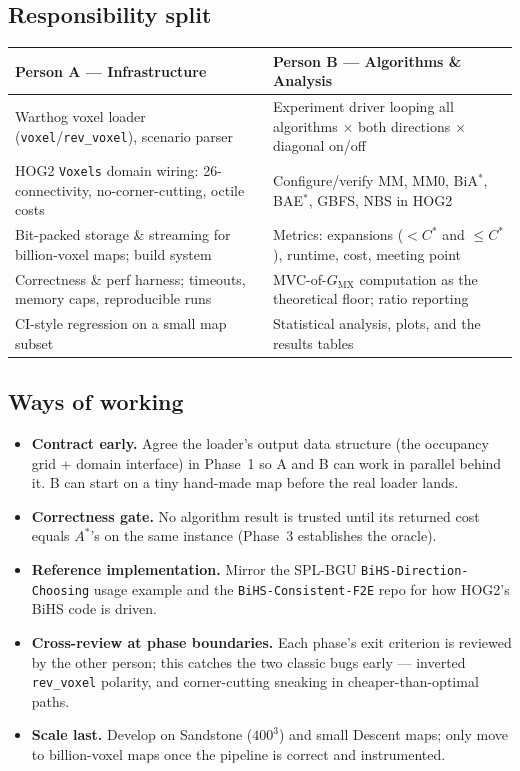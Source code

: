\documentclass[11pt]{article}
\newcommand{\Cstar}{C^{*}}
\newcommand{\GMX}{G_{\mathrm{MX}}}
\begin{document}
\subsection{Responsibility split}
\begin{center}
\renewcommand{\arraystretch}{1.25}
\begin{longtable}{@{}p{5.7cm}p{5.7cm}@{}}
\toprule
\textbf{Person A --- Infrastructure} & \textbf{Person B --- Algorithms \& Analysis}\\
\midrule
Warthog voxel loader (\texttt{voxel}/\texttt{rev\_voxel}), scenario parser & Experiment driver looping all algorithms $\times$ both directions $\times$ diagonal on/off\\
HOG2 \texttt{Voxels} domain wiring: 26-connectivity, no-corner-cutting, octile costs & Configure/verify MM, MM0, BiA$^{*}$, BAE$^{*}$, GBFS, NBS in HOG2\\
Bit-packed storage \& streaming for billion-voxel maps; build system & Metrics: expansions ($<\Cstar$ and $\le\Cstar$), runtime, cost, meeting point\\
Correctness \& perf harness; timeouts, memory caps, reproducible runs & MVC-of-$\GMX$ computation as the theoretical floor; ratio reporting\\
CI-style regression on a small map subset & Statistical analysis, plots, and the results tables\\
\bottomrule
\end{longtable}
\end{center}

\subsection{Ways of working}
\begin{itemize}[leftmargin=1.4em,itemsep=1pt]
  \item \textbf{Contract early.} Agree the loader's output data structure (the occupancy grid
        + domain interface) in Phase~1 so A and B can work in parallel behind it. B can start
        on a tiny hand-made map before the real loader lands.
  \item \textbf{Correctness gate.} No algorithm result is trusted until its returned cost
        equals $A^{*}$'s on the same instance (Phase~3 establishes the oracle).
  \item \textbf{Reference implementation.} Mirror the SPL-BGU \texttt{BiHS-Direction-Choosing}
        usage example and the \texttt{BiHS-Consistent-F2E} repo for how HOG2's BiHS code is
        driven.
  \item \textbf{Cross-review at phase boundaries.} Each phase's exit criterion is reviewed by
        the other person; this catches the two classic bugs early --- inverted
        \texttt{rev\_voxel} polarity, and corner-cutting sneaking in cheaper-than-optimal
        paths.
  \item \textbf{Scale last.} Develop on Sandstone ($400^3$) and small Descent maps; only move
        to billion-voxel maps once the pipeline is correct and instrumented.
\end{itemize}
\end{document}
